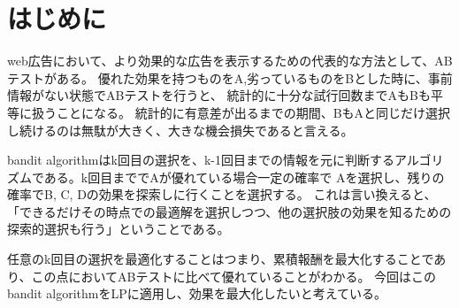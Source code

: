\documentclass[a4j,twocolumn]{jarticle}
\begin{document}
\newcommand{\vv}[1]{\mbox{\boldmath{$#1$}}}
\def\e{{\rm e}}
\topmargin -2.5cm
\textheight 26cm
\raggedbottom



\section{はじめに}
web広告において、より効果的な広告を表示するための代表的な方法として、ABテストがある。
優れた効果を持つものをA,劣っているものをBとした時に、事前情報がない状態でABテストを行うと、
統計的に十分な試行回数までAもBも平等に扱うことになる。
統計的に有意差が出るまでの期間、BもAと同じだけ選択し続けるのは無駄が大きく、大きな機会損失であると言える。

bandit algorithmはk回目の選択を、k-1回目までの情報を元に判断するアルゴリズムである。k回目まででAが優れている場合一定の確率で
Aを選択し、残りの確率でB, C, Dの効果を探索しに行くことを選択する。
これは言い換えると、「できるだけその時点での最適解を選択しつつ、他の選択肢の効果を知るための探索的選択も行う」ということである。

任意のk回目の選択を最適化することはつまり、累積報酬を最大化することであり、この点においてABテストに比べて優れていることがわかる。
今回はこのbandit algorithmをLPに適用し、効果を最大化したいと考えている。
\vspace{-6mm}
\end{document}
